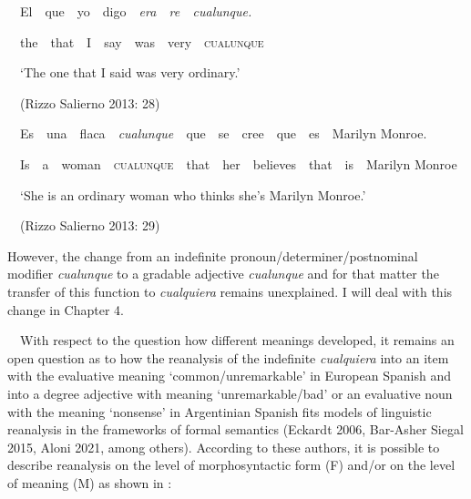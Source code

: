 \begin{styleStandard}
\ \ El\ \ que\ \ yo\ \ digo\ \ \textit{era\ \ re\ \ cualunque.\ \ }
\end{styleStandard}

\begin{styleStandard}
\ \ the\ \ that\ \ I\ \ say\ \ was\ \ very\ \ \textsc{cualunque}\textit{\ \ }
\end{styleStandard}

\begin{styleStandard}
\ \ ‘The one that I said was very ordinary.’
\end{styleStandard}

\begin{styleStandard}
\ \ (Rizzo Salierno 2013: 28)
\end{styleStandard}

\begin{styleStandard}
\ \ Es\ \ una\ \ flaca\ \ \textit{cualunque\ \ }que\ \ se\ \ cree\ \ que\ \ es\ \ Marilyn Monroe.
\end{styleStandard}

\begin{styleStandard}
\ \ Is\ \ a\ \ woman\ \ \textsc{cualunque}\textit{\ \ }that\ \ her\ \ believes\ \ that\ \ is\ \ Marilyn Monroe
\end{styleStandard}

\begin{styleStandard}
\ \ ‘She is an ordinary woman who thinks she’s Marilyn Monroe.’
\end{styleStandard}

\begin{styleStandard}
\ \ (Rizzo Salierno 2013: 29)
\end{styleStandard}

\begin{styleStandard}
However, the change from an indefinite pronoun/determiner/postnominal modifier \textit{cualunque} to a gradable adjective \textit{cualunque} and for that matter the transfer of this function to \textit{cualquiera} remains unexplained. I will deal with this change in Chapter 4. 
\end{styleStandard}

\begin{styleStandard}
\ \ With respect to the question how different meanings developed, it remains an open question as to how the reanalysis of the indefinite \textit{cualquiera} into an item with the evaluative meaning ‘common/unremarkable’ in European Spanish and into a degree adjective with meaning ‘unremarkable/bad’ or an evaluative noun with the meaning ‘nonsense’ in Argentinian Spanish fits models of linguistic reanalysis in the frameworks of formal semantics (Eckardt 2006, Bar-Asher Siegal 2015, Aloni 2021, among others). According to these authors, it is possible to describe reanalysis on the level of morphosyntactic form (F) and/or on the level of meaning (M) as shown in :
\end{styleStandard}

